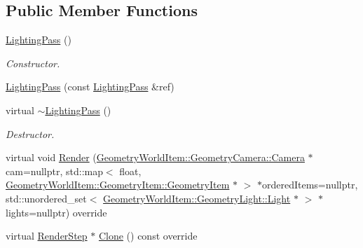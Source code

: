 \subsection*{Public Member Functions}
\begin{DoxyCompactItemize}
\item 
\mbox{\label{class_geometry_engine_1_1_geometry_render_step_1_1_lighting_pass_a5fb6ea8b19fe0067bfa89ef446934fc3}} 
\mbox{\hyperlink{class_geometry_engine_1_1_geometry_render_step_1_1_lighting_pass_a5fb6ea8b19fe0067bfa89ef446934fc3}{Lighting\+Pass}} ()
\begin{DoxyCompactList}\small\item\em Constructor. \end{DoxyCompactList}\item 
\mbox{\hyperlink{class_geometry_engine_1_1_geometry_render_step_1_1_lighting_pass_ab25f4db452340113c3ace2ab6994bd9f}{Lighting\+Pass}} (const \mbox{\hyperlink{class_geometry_engine_1_1_geometry_render_step_1_1_lighting_pass}{Lighting\+Pass}} \&ref)
\item 
\mbox{\label{class_geometry_engine_1_1_geometry_render_step_1_1_lighting_pass_a1170635cec58a539398cd93024974870}} 
virtual \mbox{\hyperlink{class_geometry_engine_1_1_geometry_render_step_1_1_lighting_pass_a1170635cec58a539398cd93024974870}{$\sim$\+Lighting\+Pass}} ()
\begin{DoxyCompactList}\small\item\em Destructor. \end{DoxyCompactList}\item 
virtual void \mbox{\hyperlink{class_geometry_engine_1_1_geometry_render_step_1_1_lighting_pass_a3f8631da2e61e9a9092a53395b320ecb}{Render}} (\mbox{\hyperlink{class_geometry_engine_1_1_geometry_world_item_1_1_geometry_camera_1_1_camera}{Geometry\+World\+Item\+::\+Geometry\+Camera\+::\+Camera}} $\ast$cam=nullptr, std\+::map$<$ float, \mbox{\hyperlink{class_geometry_engine_1_1_geometry_world_item_1_1_geometry_item_1_1_geometry_item}{Geometry\+World\+Item\+::\+Geometry\+Item\+::\+Geometry\+Item}} $\ast$ $>$ $\ast$ordered\+Items=nullptr, std\+::unordered\+\_\+set$<$ \mbox{\hyperlink{class_geometry_engine_1_1_geometry_world_item_1_1_geometry_light_1_1_light}{Geometry\+World\+Item\+::\+Geometry\+Light\+::\+Light}} $\ast$ $>$ $\ast$lights=nullptr) override
\item 
virtual \mbox{\hyperlink{class_geometry_engine_1_1_geometry_render_step_1_1_render_step}{Render\+Step}} $\ast$ \mbox{\hyperlink{class_geometry_engine_1_1_geometry_render_step_1_1_lighting_pass_a4f1cb36c7bf6a90d0aa3b8e8feba5e5e}{Clone}} () const override
\end{DoxyCompactItemize}
